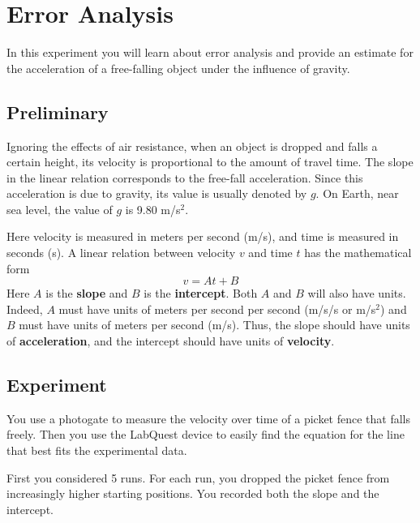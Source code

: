\setcounter{chapter}{1}
\chapter{Error Analysis}
In this experiment you will learn about error analysis and provide an estimate for the acceleration of a free-falling object under the influence of gravity.
\section{Preliminary}
Ignoring the effects of air resistance, when an object is dropped and falls a certain height, its velocity is proportional to the amount of travel time. The slope in the linear relation corresponds to the free-fall acceleration. Since this acceleration is due to gravity, its value is usually denoted by $g$. On Earth, near sea level, the value of $g$ is 9.80 m/s$^{2}$.

Here velocity is measured in meters per second (m/s), and time is measured in seconds (s). A linear relation between velocity $v$ and time $t$ has the mathematical form
\begin{equation}
    v = A t + B
\end{equation}
Here $A$ is the \textbf{slope} and $B$ is the \textbf{intercept}. Both $A$ and $B$ will also have units. Indeed, $A$ must have units of meters per second per second (m/s/s or m/s$^{2}$) and $B$ must have units of meters per second (m/s). Thus, the slope should have units of \textbf{acceleration}, and the intercept should have units of \textbf{velocity}.
\section{Experiment}
You use a photogate to measure the velocity over time of a picket fence that falls freely. Then you use the LabQuest device to easily find the equation for the line that best fits the experimental data.

First you considered 5 runs. For each run, you dropped the picket fence from increasingly higher starting positions. You recorded both the slope and the intercept.

